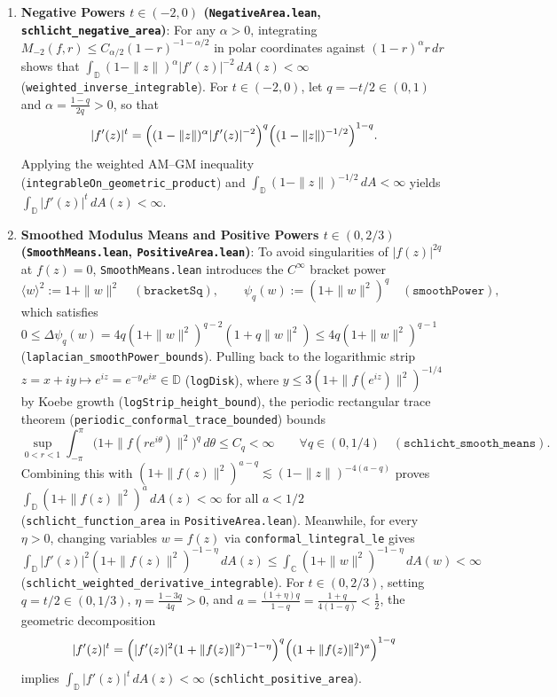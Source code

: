 \documentclass[11pt,reqno]{amsart}
\theoremstyle{definition}
\newcommand{\D}{\mathbb{D}}
\newcommand{\C}{\mathbb{C}}
\begin{document}
\begin{enumerate}[label=(\arabic*)]
\item \textbf{Negative Powers $t \in (-2, 0)$ (\texttt{NegativeArea.lean}, \texttt{schlicht\_negative\_area})}:
For any $\alpha > 0$, integrating $M_{-2}(f,r) \le C_{\alpha/2}(1-r)^{-1-\alpha/2}$ in polar coordinates against $(1-r)^\alpha r\,dr$ shows that $\int_{\D} (1-\|z\|)^\alpha |f'(z)|^{-2}\,dA(z) < \infty$ (\texttt{weighted\_inverse\_integrable}). For $t \in (-2,0)$, let $q = -t/2 \in (0,1)$ and $\alpha = \frac{1-q}{2q} > 0$, so that
\[
|f'(z)|^t = \Bigl((1-\|z\|)^\alpha |f'(z)|^{-2}\Bigr)^q \Bigl((1-\|z\|)^{-1/2}\Bigr)^{1-q}.
\]
Applying the weighted AM--GM inequality (\texttt{integrableOn\_geometric\_product}) and $\int_{\D}(1-\|z\|)^{-1/2}\,dA < \infty$ yields $\int_{\D}|f'(z)|^t\,dA(z) < \infty$.

\item \textbf{Smoothed Modulus Means and Positive Powers $t \in (0, 2/3)$ (\texttt{SmoothMeans.lean}, \texttt{PositiveArea.lean})}:
To avoid singularities of $|f(z)|^{2q}$ at $f(z)=0$, \texttt{SmoothMeans.lean} introduces the $C^\infty$ bracket power
\[
\langle w \rangle^2 := 1 + \|w\|^2 \quad (\texttt{bracketSq}), \qquad
\psi_q(w) := (1 + \|w\|^2)^q \quad (\texttt{smoothPower}),
\]
which satisfies $0 \le \Delta \psi_q(w) = 4q(1+\|w\|^2)^{q-2}(1+q\|w\|^2) \le 4q(1+\|w\|^2)^{q-1}$ (\texttt{laplacian\_smoothPower\_bounds}). Pulling back to the logarithmic strip $z = x+iy \mapsto e^{iz} = e^{-y}e^{ix} \in \D$ (\texttt{logDisk}), where $y \le 3(1+\|f(e^{iz})\|^2)^{-1/4}$ by Koebe growth (\texttt{logStrip\_height\_bound}), the periodic rectangular trace theorem (\texttt{periodic\_conformal\_trace\_bounded}) bounds
\[
\sup_{0 < r < 1} \int_{-\pi}^{\pi} \bigl(1 + \|f(r e^{i\theta})\|^2\bigr)^q\,d\theta \le C_q < \infty \qquad \forall q \in (0, 1/4) \quad (\texttt{schlicht\_smooth\_means}).
\]
Combining this with $(1+\|f(z)\|^2)^{a-q} \lesssim (1-\|z\|)^{-4(a-q)}$ proves $\int_{\D}(1+\|f(z)\|^2)^a\,dA(z) < \infty$ for all $a < 1/2$ (\texttt{schlicht\_function\_area} in \texttt{PositiveArea.lean}). Meanwhile, for every $\eta > 0$, changing variables $w = f(z)$ via \texttt{conformal\_lintegral\_le} gives $\int_{\D} |f'(z)|^2 (1+\|f(z)\|^2)^{-1-\eta}\,dA(z) \le \int_{\C} (1+\|w\|^2)^{-1-\eta}\,dA(w) < \infty$ (\texttt{schlicht\_weighted\_derivative\_integrable}). For $t \in (0, 2/3)$, setting $q = t/2 \in (0, 1/3)$, $\eta = \frac{1-3q}{4q} > 0$, and $a = \frac{(1+\eta)q}{1-q} = \frac{1+q}{4(1-q)} < \frac{1}{2}$, the geometric decomposition
\[
|f'(z)|^t = \Bigl(|f'(z)|^2 (1+\|f(z)\|^2)^{-1-\eta}\Bigr)^q \Bigl((1+\|f(z)\|^2)^a\Bigr)^{1-q}
\]
implies $\int_{\D}|f'(z)|^t\,dA(z) < \infty$ (\texttt{schlicht\_positive\_area}).


\end{enumerate}
\end{document}
